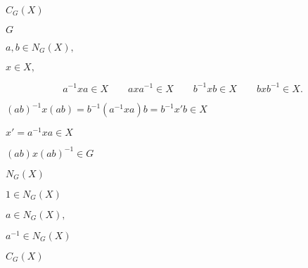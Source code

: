 \documentclass[10pt]{book}
\begin{document}
\begin{mdSnippets}
\begin{mdInlineSnippet}
$C_G(X)$\end{mdInlineSnippet}%
\begin{mdInlineSnippet}[dfcf28d0734569a6a693bc8194de62bf]%
$G$\end{mdInlineSnippet}%
\begin{mdInlineSnippet}%
$a,b \in N_G(X),$\end{mdInlineSnippet}%
\begin{mdInlineSnippet}%
$x \in X,$\end{mdInlineSnippet}%
\begin{mdDisplaySnippet}[0e1e9bc2a19c2200be0281d613f503bd]%
\[%
a^{-1}xa \in X \qquad axa^{-1} \in X \qquad b^{-1}xb \in X \qquad bxb^{-1} \in X.
\]%
\end{mdDisplaySnippet}%
\begin{mdInlineSnippet}%
$(ab)^{-1}x(ab) = b^{-1}(a^{-1}xa)b = b^{-1}x'b \in X$\end{mdInlineSnippet}%
\begin{mdInlineSnippet}[6f0e080991aa31ee70fd5282c3c1fabe]%
$x' = a^{-1}xa \in X$\end{mdInlineSnippet}%
\begin{mdInlineSnippet}[fce2ba8cf4425d904e6e2cb76083ab06]%
$(ab)x(ab)^{-1} \in G$\end{mdInlineSnippet}%
\begin{mdInlineSnippet}%
$N_G(X)$\end{mdInlineSnippet}%
\begin{mdInlineSnippet}[98668c9c81ec3ce055b6680058d2077b]%
$1 \in N_G(X)$\end{mdInlineSnippet}%
\begin{mdInlineSnippet}%
$a \in N_G(X),$\end{mdInlineSnippet}%
\begin{mdInlineSnippet}[bb873231622b80f1cc166fb38615d5cc]%
$a^{-1} \in N_G(X)$\end{mdInlineSnippet}%
\begin{mdInlineSnippet}%
$C_G(X)$\end{mdInlineSnippet}%

\end{mdSnippets}
\end{document}

